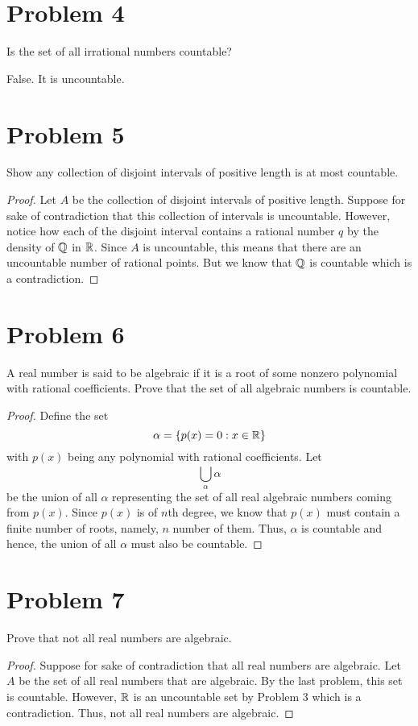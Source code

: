 \documentclass[11pt,a4paper]{article}
\begin{document}
\section*{Problem 4} Is the set of all irrational numbers countable?
\begin{solution}
False. It is uncountable.
\end{solution}

\section*{Problem 5} Show any collection of disjoint intervals of positive length is at most countable.
\begin{proof}
Let \( A  \) be the collection of disjoint intervals of positive length. Suppose for sake of contradiction that this collection of intervals is uncountable. However, notice how each of the disjoint interval contains a rational number \( q  \) by the density of \( \mathbb{Q}  \) in \( \mathbb{R} \). Since \( A  \) is uncountable, this means that there are an uncountable number of rational points. But we know that \( \mathbb{Q}  \) is countable which is a contradiction.
\end{proof}

\section*{Problem 6} A real number is said to be algebraic if it is a root of some nonzero polynomial with rational coefficients. Prove that the set of all algebraic numbers is countable.
\begin{proof}
Define the set
\[  \alpha = \{ p(x) = 0 : x \in \mathbb{R}  \}  \] with \( p(x)  \) being any polynomial with rational coefficients. Let  
\[  \bigcup_{ \alpha  }^{  }  \alpha  \] be the union of all \( \alpha  \) representing the set of all real algebraic numbers coming from \( p(x) \). Since \( p(x) \) is of \( n \)th degree, we know that \( p(x) \) must contain a finite number of roots, namely, \( n  \) number of them. Thus, \( \alpha  \) is countable and hence, the union of all \( \alpha  \) must also be countable.  
\end{proof}

\section*{Problem 7} Prove that not all real numbers are algebraic.
\begin{proof}
    Suppose for sake of contradiction that all real numbers are algebraic. Let \( A  \) be the set of all real numbers that are algebraic. By the last problem, this set is countable. However, \( \mathbb{R}  \) is an uncountable set by Problem 3 which is a contradiction. Thus, not all real numbers are algebraic.  
\end{proof}
\end{document}
